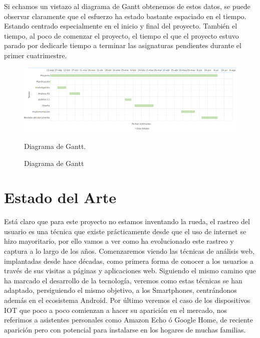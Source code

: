 \documentclass[12pt,a4paper,oneside]{book} %
\begin{document}
Si echamos un vistazo al diagrama de Gantt obtenemos de estos datos, se puede observar claramente que el esfuerzo ha estado bastante espaciado en el tiempo. Estando centrado especialmente en el inicio y final del proyecto. También el tiempo, al poco de comenzar el proyecto, el tiempo el que el proyecto estuvo parado por dedicarle tiempo a terminar las asignaturas pendientes durante el primer cuatrimestre.
\begin{landscape}
\begin{figure}[htb]
\begin{center}
	\includegraphics[scale=0.47	]{pictures/planificacion_grafica.png}
	\caption{Diagrama de Gantt}{Diagrama de Gantt.}
    		\label{fig:Diagrama de Gantt}
\end{center}
\end{figure}
\end{landscape}

\chapter{Estado del Arte}
Está claro que para este proyecto no estamos inventando la rueda, el rastreo del usuario es una técnica que existe prácticamente desde que el uso de internet se hizo mayoritario, por ello vamos a ver como ha evolucionado este rastreo y captura a lo largo de los años. 
\newline \newline 
Comenzaremos viendo las técnicas de análisis web, implantadas desde hace décadas, como primera forma de conocer a los usuarios a través de sus visitas a páginas y aplicaciones web. 
\newline \newline
Siguiendo el mismo camino que ha marcado el desarrollo de la tecnología, veremos como estas técnicas se han adaptado, persiguiendo el mismo objetivo, a los Smartphones, centrándonos además en el ecosistema Android. 
\newline \newline 
Por último veremos el caso de los dispositivos IOT que poco a poco comienzan a hacer su aparición en el mercado, nos referimos a asistentes personales como Amazon Echo ó Google Home, de reciente aparición pero con potencial para instalarse en los hogares de muchas familias.
\newpage 
\end{document}
